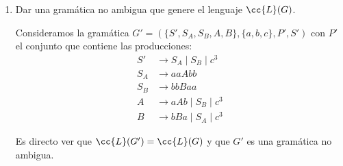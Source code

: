 \documentclass[12pt]{article}
\begin{document}
\begin{ejercicio}
\begin{enumerate}
        \begin{comment}
        \begin{figure}
            \centering
            \resizebox{0.49\textwidth}{!}{
                \begin{forest}for tree={
                    edge={-}, %
                    fit=rectangle, %
                }
                    [$S$
                        [$a$]
                        [$b$]
                        [$S$
                            [$a$]
                            [$b$]
                            [$S$
                                [$c$]
                                [$c$]
                                [$c$]
                            ]
                            [$b$]
                            [$a$]
                        ]
                        [$b$]
                        [$a$]
                    ]
                \end{forest}
            }
            \resizebox{0.49\textwidth}{!}{
            \begin{forest}for tree={
                edge={-}, %
                fit=rectangle, %
            }
                [$S$
                    [$a$]
                    [$b$]
                    [$a$]
                    [$b$]
                    [$S$
                        [$c$]
                        [$c$]
                        [$c$]
                    ]
                    [$a$]
                    [$b$]
                    [$a$]
                    [$b$]
                ]
            \end{forest}
            }
            \caption{Árboles de derivación para $(ab)^2c^3(ba)^2$.}
            \label{fig:arboles}
        \end{figure}
        \end{comment}
        \item Dar una gramática no ambigua que genere el lenguaje $\cc{L}(G)$.
        
        Consideramos la gramática $G'=(\{S', S_A, S_B, A, B\},\{a,b,c\},P',S')$ con $P'$ el conjunto que contiene las producciones:
        \begin{equation*}
            \begin{aligned}
                S' &\to S_A\mid S_B\mid c^3\\
                S_A &\to aaAbb\\
                S_B &\to bbBaa\\
                A &\to aAb \mid S_B\mid c^3\\
                B &\to bBa \mid S_A\mid c^3
            \end{aligned}
        \end{equation*}

        Es directo ver que $\cc{L}(G')=\cc{L}(G)$ y que $G'$ es una gramática no ambigua.
    \end{enumerate}
\end{ejercicio}
\end{document}
